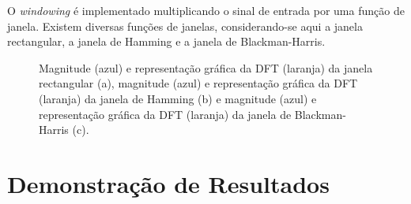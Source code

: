 \documentclass[11pt]{article}
\numberwithin{equation}{section}
\begin{document}
O \textit{windowing} é implementado multiplicando o sinal de entrada por uma função de janela. Existem diversas funções de janelas, considerando-se aqui a janela rectangular, a janela de Hamming e a janela de Blackman-Harris.

\begin{figure}[H]
	\centering
	\linebreak
	\linebreak
	\vspace{-0.8em}
	\caption{Magnitude (azul) e representação gráfica da DFT (laranja) da janela rectangular (a), magnitude (azul) e representação gráfica da DFT (laranja) da janela de Hamming (b) e  magnitude (azul) e representação gráfica da DFT (laranja) da janela de Blackman-Harris (c).}
	\vspace{-0.8em}
\end{figure}

\section{Demonstração de Resultados}
\end{document}
